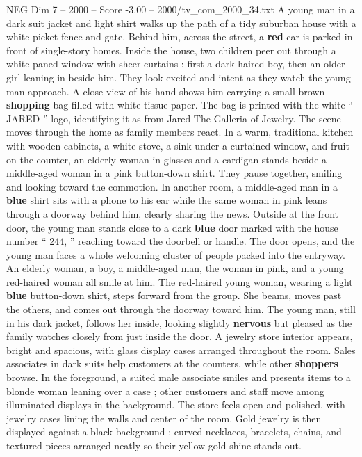 \begin{textsample}{NEG Dim 7 – 2000 – Score -3.00 – 2000/tv\_com\_2000\_34.txt}  \label{ex:f7_neg_027}
A young man in a dark suit jacket and light shirt walks up the path of a tidy suburban house with a white picket fence and gate.
Behind him, across the street, a \textbf{red} car is parked in front of single-story homes.
Inside the house, two children peer out through a white-paned window with sheer curtains : first a dark-haired boy, then an older girl leaning in beside him.
They look excited and intent as they watch the young man approach.
A close view of his hand shows him carrying a small brown \textbf{shopping} bag filled with white tissue paper.
The bag is printed with the white “ JARED ” logo, identifying it as from Jared The Galleria of Jewelry.
The scene moves through the home as family members react.
In a warm, traditional kitchen with wooden cabinets, a white stove, a sink under a curtained window, and fruit on the counter, an elderly woman in glasses and a cardigan stands beside a middle-aged woman in a pink button-down shirt.
They pause together, smiling and looking toward the commotion.
In another room, a middle-aged man in a \textbf{blue} shirt sits with a phone to his ear while the same woman in pink leans through a doorway behind him, clearly sharing the news.
Outside at the front door, the young man stands close to a dark \textbf{blue} door marked with the house number “ 244, ” reaching toward the doorbell or handle.
The door opens, and the young man faces a whole welcoming cluster of people packed into the entryway.
An elderly woman, a boy, a middle-aged man, the woman in pink, and a young red-haired woman all smile at him.
The red-haired young woman, wearing a light \textbf{blue} button-down shirt, steps forward from the group.
She beams, moves past the others, and comes out through the doorway toward him.
The young man, still in his dark jacket, follows her inside, looking slightly \textbf{nervous} but pleased as the family watches closely from just inside the door.
A jewelry store interior appears, bright and spacious, with glass display cases arranged throughout the room.
Sales associates in dark suits help customers at the counters, while other \textbf{shoppers} browse.
In the foreground, a suited male associate smiles and presents items to a blonde woman leaning over a case ; other customers and staff move among illuminated displays in the background.
The store feels open and polished, with jewelry cases lining the walls and center of the room.
Gold jewelry is then displayed against a black background : curved necklaces, bracelets, chains, and textured pieces arranged neatly so their yellow-gold shine stands out.

\end{textsample}
